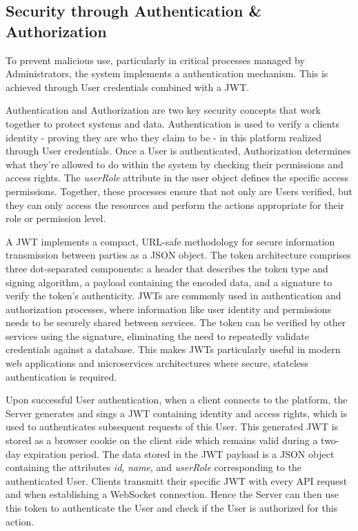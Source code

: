 \subsection{Security through Authentication \& Authorization}
\label{subsec:implementation:authentication}
To prevent malicious use, particularly in critical processes managed by Administrators, the system implements a authentication mechanism. This is achieved through User credentials combined with a \ac{JWT}.

Authentication and Authorization are two key security concepts that work together to protect systems and data. Authentication is used to verify a clients identity - proving they are who they claim to be - in this platform realized through User credentials. Once a User is authenticated, Authorization determines what they're allowed to do within the system by checking their permissions and access rights. The \emph{userRole} attribute in the user object defines the specific access permissions. Together, these processes ensure that not only are Users verified, but they can only access the resources and perform the actions appropriate for their role or permission level.

A \ac{JWT} implements a compact, URL-safe methodology for secure information transmission between parties as a \ac{JSON} object. The token architecture comprises three dot-separated components: a header that describes the token type and signing algorithm, a payload containing the encoded data, and a signature to verify the token's authenticity. \ac{JWT}s are commonly used in authentication and authorization processes, where information like user identity and permissions needs to be securely shared between services. The token can be verified by other services using the signature, eliminating the need to repeatedly validate credentials against a database. This makes \ac{JWT}s particularly useful in modern web applications and microservices architectures where secure, stateless authentication is required. \cite{implementation:jwt}

Upon successful User authentication, when a client connects to the platform, the Server generates and sings a \ac{JWT} containing identity and access rights, which is used to authenticates subsequent requests of this User. This generated \ac{JWT} is stored as a browser cookie on the client side which remains valid during a two-day expiration period. The data stored in the \ac{JWT} payload is a \ac{JSON} object containing the attributes \emph{id}, \emph{name}, and \emph{userRole} corresponding to the authenticated User. Clients transmitt their specific \ac{JWT} with every \ac{API} request and when establishing a WebSocket connection. Hence the Server can then use this token to authenticate the User and check if the User is authorized for this action.

